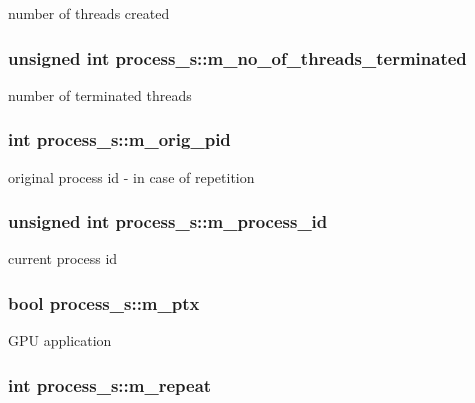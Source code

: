 number of threads created \hypertarget{structprocess__s_a0debe2b803da90b86dcbd113fa79c5e4}{
\subsubsection[{m\_\-no\_\-of\_\-threads\_\-terminated}]{\setlength{\rightskip}{0pt plus 5cm}unsigned int {\bf process\_\-s::m\_\-no\_\-of\_\-threads\_\-terminated}}}
\label{structprocess__s_a0debe2b803da90b86dcbd113fa79c5e4}
number of terminated threads \hypertarget{structprocess__s_af321df6fbc03573f3b665b27b857446e}{
\subsubsection[{m\_\-orig\_\-pid}]{\setlength{\rightskip}{0pt plus 5cm}int {\bf process\_\-s::m\_\-orig\_\-pid}}}
\label{structprocess__s_af321df6fbc03573f3b665b27b857446e}
original process id -\/ in case of repetition \hypertarget{structprocess__s_a177fa7999a4380f87de1d1020972d0d8}{
\subsubsection[{m\_\-process\_\-id}]{\setlength{\rightskip}{0pt plus 5cm}unsigned int {\bf process\_\-s::m\_\-process\_\-id}}}
\label{structprocess__s_a177fa7999a4380f87de1d1020972d0d8}
current process id \hypertarget{structprocess__s_a4578e18b431979d88d1782a080c0b4ce}{
\subsubsection[{m\_\-ptx}]{\setlength{\rightskip}{0pt plus 5cm}bool {\bf process\_\-s::m\_\-ptx}}}
\label{structprocess__s_a4578e18b431979d88d1782a080c0b4ce}
GPU application \hypertarget{structprocess__s_a7f5a5304526964f084a24b68b0132d7a}{
\subsubsection[{m\_\-repeat}]{\setlength{\rightskip}{0pt plus 5cm}int {\bf process\_\-s::m\_\-repeat}}}
